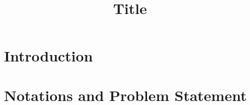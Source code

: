 \documentclass[conference]{IEEEtran}
\begin{document}
\title{Title}

\author{
\and
{} 
}


\maketitle

\begin{abstract}
\end{abstract}

\begin{IEEEkeywords}
\end{IEEEkeywords}

\glsresetall

\section{Introduction}
\section{Notations and Problem Statement}\label{sec:notation}
\appendices
\printbibliography
\end{document}
